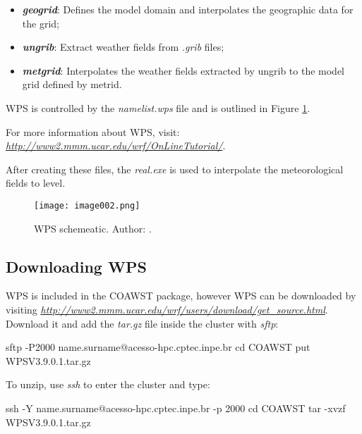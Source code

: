 \begin{itemize}
\item \textbf{\textit{geogrid}}: Defines the model domain and interpolates the geographic data for the grid;
\item \textbf{\textit{ungrib}}: Extract weather fields from \textit{.grib} files;
\item \textbf{\textit{metgrid}}: Interpolates the weather fields extracted by ungrib to the model grid defined by metrid.
\end{itemize}
\bigskip

\noindent WPS is controlled by the \textit{namelist.wps} file and is outlined in Figure \textcolor{bleu_cite}{\ref{wpsdetalha}}.
\bigskip

\noindent For more information about WPS, visit: \textcolor{bleu_cite}{\href{http://www2.mmm.ucar.edu/wrf/OnLineTutorial/}{\textit{http://www2.mmm.ucar.edu/wrf/OnLineTutorial/}}}.
\bigskip

\noindent After creating these files, the \textit{real.exe} is used to interpolate the meteorological fields to \texteta level.
\bigskip

\begin{figure}[H]
    \centering
    \texttt{[image: image002.png]}
    \caption{WPS schemeatic. \newline Author: \textcite{duda2006}.}
    \label{wpsdetalha}
\end{figure}
\bigskip

\subsection{Downloading WPS}
\bigskip

\noindent WPS is included in the COAWST package, however WPS can be downloaded by visiting 
\textcolor{bleu_cite}{\href{http://www2.mmm.ucar.edu/wrf/users/download/get\_source.html}{\textit{http://www2.mmm.ucar.edu/wrf/users/download/get\_source.html}}}. 
Download it and add the \textit{tar.gz} file inside the cluster with \textit{sftp}:
\bigskip

\begin{bashcode}
sftp -P2000 name.surname@acesso-hpc.cptec.inpe.br
cd COAWST
put WPSV3.9.0.1.tar.gz
\end{bashcode}
\bigskip

\noindent To unzip, use \textit{ssh} to enter the cluster and type:
\bigskip

\begin{bashcode}
ssh -Y name.surname@acesso-hpc.cptec.inpe.br -p 2000
cd COAWST
tar -xvzf WPSV3.9.0.1.tar.gz
\end{bashcode}
\bigskip

